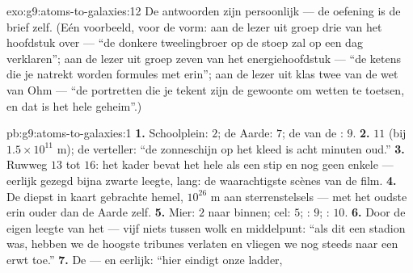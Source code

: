 \begin{solution}{exo:g9:atoms-to-galaxies:12}
De antwoorden zijn persoonlijk --- de oefening is de brief zelf. (Eén
voorbeeld, voor de vorm: aan de lezer uit groep drie van het hoofdstuk
over  --- ``de donkere tweelingbroer op de stoep zal
op een dag  verklaren''; aan de lezer uit groep zeven
van het energiehoofdstuk --- ``de ketens die je natrekt worden
formules met  erin''; aan de lezer uit klas twee van de
wet van Ohm --- ``de portretten die je tekent zijn de gewoonte om wetten
te toetsen, en dat is het hele geheim''.)
\end{solution}

\begin{solution}{pb:g9:atoms-to-galaxies:1}
\textbf{1.} Schoolplein:  $2$; de Aarde:  $7$; de
 van de :  $9$.
\textbf{2.}  $11$ (bij $1.5 \times 10^{11}$ \unit{m}); de
verteller: ``de zonneschijn op het kleed is acht minuten oud.''
\textbf{3.} Ruwweg  $13$ tot $16$: het kader bevat het hele
 als een stip en nog geen enkele
 --- eerlijk gezegd bijna zwarte leegte,  lang: de
waarachtigste scènes van de film.
\textbf{4.} De diepst in kaart gebrachte hemel, $10^{26}$ \unit{m} aan
sterrenstelsels --- met het oudste  erin ouder dan de Aarde
zelf.
\textbf{5.} Mier:  $2$ naar binnen; cel:  $5$;
:  $9$; :  $10$.
\textbf{6.} Door de eigen leegte van het  --- vijf 
niets tussen wolk en middelpunt: ``als dit  een stadion was,
hebben we de hoogste tribunes verlaten en vliegen we nog steeds naar een
erwt toe.''
\textbf{7.} De  --- en eerlijk: ``hier eindigt onze ladder,

\end{solution}
